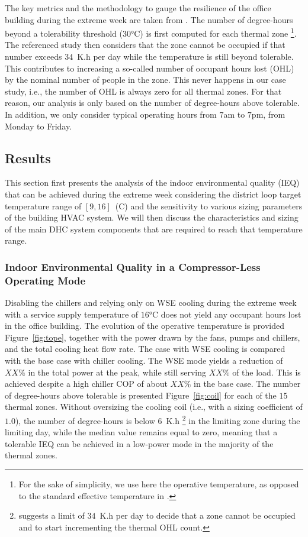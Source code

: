 The key metrics and the methodology to gauge the resilience of the office building during the extreme week are taken from \cite{Mathew2021}.
The number of degree-hours beyond a tolerability threshold ($30$°C) is first computed for each thermal zone%
\footnote{For the sake of simplicity, we use here the operative temperature, as opposed to the standard effective temperature in \cite{Mathew2021}.}.
The referenced study then considers that the zone cannot be occupied if that number exceeds $34$~K.h per day while the temperature is still beyond tolerable. This contributes to increasing a so-called number of occupant hours lost (OHL) by the nominal number of people in the zone.
This never happens in our case study, i.e., the number of OHL is always zero for all thermal zones.
For that reason, our analysis is only based on the number of degree-hours above tolerable. In addition, we only consider typical operating hours from $7$am to $7$pm, from Monday to Friday.


\subsection{Results} \label{sec:results}

This section first presents the analysis of the indoor environmental quality (IEQ) that can be achieved during the extreme week considering the district loop target temperature range of $[9, 16]$~(C) and the sensitivity to various sizing parameters of the building HVAC system.
We will then discuss the characteristics and sizing of the main DHC system components that are required to reach that temperature range.


\subsubsection{Indoor Environmental Quality in a Compressor-Less Operating Mode} \label{sec:ieq}

Disabling the chillers and relying only on WSE cooling during the extreme week with a service supply temperature of $16$°C does not yield any occupant hours lost in the office building.
The evolution of the operative temperature is provided Figure~\ref{fig:tope}, together with the power drawn by the fans, pumps and chillers, and the total cooling heat flow rate. The case with WSE cooling is compared with the base case with chiller cooling.
The WSE mode yields a reduction of $XX\%$ in the total power at the peak, while still serving $XX\%$ of the load. This is achieved despite a high chiller COP of about $XX\%$ in the base case.
The number of degree-hours above tolerable is presented Figure~\ref{fig:coil} for each of the $15$ thermal zones. Without oversizing the cooling coil (i.e., with a sizing coefficient of $1.0$), the number of degree-hours is below $6$~K.h%
\footnote{%
\cite{Mathew2021} suggests a limit of $34$~K.h per day to decide that a zone cannot be occupied and to start incrementing the thermal OHL count.}
in the limiting zone during the limiting day, while the median value remains equal to zero, meaning that a tolerable IEQ can be achieved in a low-power mode in the majority of the thermal zones.

